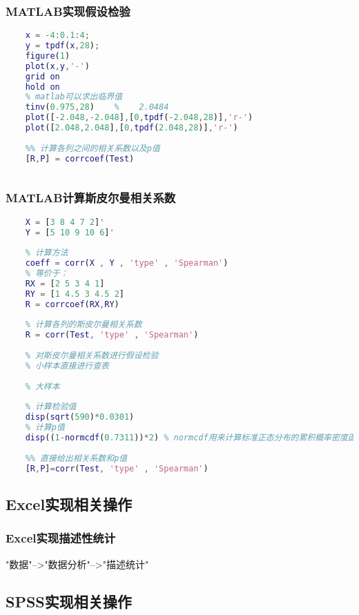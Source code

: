 \documentclass{article}
\begin{document}
\subsubsection{MATLAB实现假设检验}
\begin{lstlisting}[language=Matlab]
    %% 假设检验
    x = -4:0.1:4;
    y = tpdf(x,28);  
    figure(1)
    plot(x,y,'-')
    grid on  
    hold on  
    % matlab可以求出临界值
    tinv(0.975,28)    %    2.0484
    plot([-2.048,-2.048],[0,tpdf(-2.048,28)],'r-')
    plot([2.048,2.048],[0,tpdf(2.048,28)],'r-')
    
    %% 计算各列之间的相关系数以及p值
    [R,P] = corrcoef(Test)
    
\end{lstlisting} 

\subsubsection{MATLAB计算斯皮尔曼相关系数}
\begin{lstlisting}[language=Matlab]
    %% 计算斯皮尔曼相关系数
    X = [3 8 4 7 2]'  
    Y = [5 10 9 10 6]'
    
    % 计算方法
    coeff = corr(X , Y , 'type' , 'Spearman')
    % 等价于：
    RX = [2 5 3 4 1]
    RY = [1 4.5 3 4.5 2]
    R = corrcoef(RX,RY)
    
    % 计算各列的斯皮尔曼相关系数
    R = corr(Test, 'type' , 'Spearman')
    
    % 对斯皮尔曼相关系数进行假设检验
    % 小样本直接进行查表
    
    % 大样本
    
    % 计算检验值
    disp(sqrt(590)*0.0301)
    % 计算p值
    disp((1-normcdf(0.7311))*2) % normcdf用来计算标准正态分布的累积概率密度函数
    
    %% 直接给出相关系数和p值
    [R,P]=corr(Test, 'type' , 'Spearman')

\end{lstlisting} 

\subsection{Excel实现相关操作}
\subsubsection{Excel实现描述性统计}
"数据"-->"数据分析"-->"描述统计"



\subsection{SPSS实现相关操作}
\end{document}
